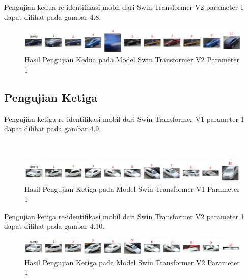 Pengujian kedua re-identifikasi mobil dari Swin Transformer V2 parameter 1 dapat dilihat pada gambar 4.8.

\begin{figure}[h!]
  \centering
  \includegraphics[scale=0.6]{gambar/Que57V2P1IT1.png}
  \caption{Hasil Pengujian Kedua pada Model Swin Transformer V2 Parameter 1}
  \label{fig:hasilpengujiankeduapadamodelswintransformerv2param1}
\end{figure}

\subsection{Pengujian Ketiga}

Pengujian ketiga re-identifikasi mobil dari Swin Transformer V1 parameter 1 dapat dilihat pada gambar 4.9. \\
\\
\\

\begin{figure}[ht]
  \centering
  \includegraphics[scale=0.6]{gambar/Que61V1P1IT3.png}
  \caption{Hasil Pengujian Ketiga pada Model Swin Transformer V1 Parameter 1}
  \label{fig:hasilpengujianketigapadamodelswintransformerv1param1}
\end{figure}

Pengujian ketiga re-identifikasi mobil dari Swin Transformer V2 parameter 1 dapat dilihat pada gambar 4.10.

\begin{figure}[ht]
  \centering
  \includegraphics[scale=0.6]{gambar/Que61V2P1IT1.png}
  \caption{Hasil Pengujian Ketiga pada Model Swin Transformer V2 Parameter 1}
  \label{fig:hasilpengujianketigapadamodelswintransformerv2param1}
\end{figure}

